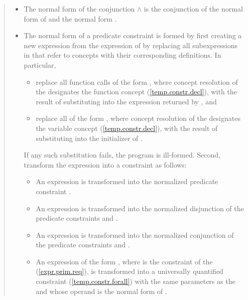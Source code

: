 \begin{quote}
\begin{itemize}
\item The normal form of the conjunction  $\land$  is the 
conjunction of the normal form of  and the normal form .

\item The normal form of a predicate constraint  is formed by
first creating a new expression  from the expression of  by 
replacing all subexpressions in  that refer to concepts with their 
corresponding definitions. In particular,
% 
\begin{itemize}

\item replace all function calls of the form 
, where concept resolution of the
  designates 
the function concept  (\ref{temp.constr.decl}),
with the result of substituting  into the 
expression returned by , and

\item replace all  of the form 
, where concept resolution of the 
  designates
the variable concept  (\ref{temp.constr.decl}),
with the result of substituting  
into the initializer of .
\end{itemize}
% 
If any such substitution fails, the program is ill-formed.
% 
Second, transform the expression  into a constraint as follows:
\begin{itemize}
\item An expression  is transformed into the normalized predicate 
constraint .

\item An expression  is transformed into the normalized 
disjunction of the predicate constraints  and .

\item An expression  is transformed into the normalized
conjunction of the predicate constraints  and .

\item An expression of the form 
,
where  is the constraint of the  
(\ref{expr.prim.req}), is transformed into
a universally quantified constraint (\ref{temp.constr.forall})
with the same parameters as the  and whose
operand is the normal form of . 


\end{itemize}
\end{itemize}
\end{quote}
